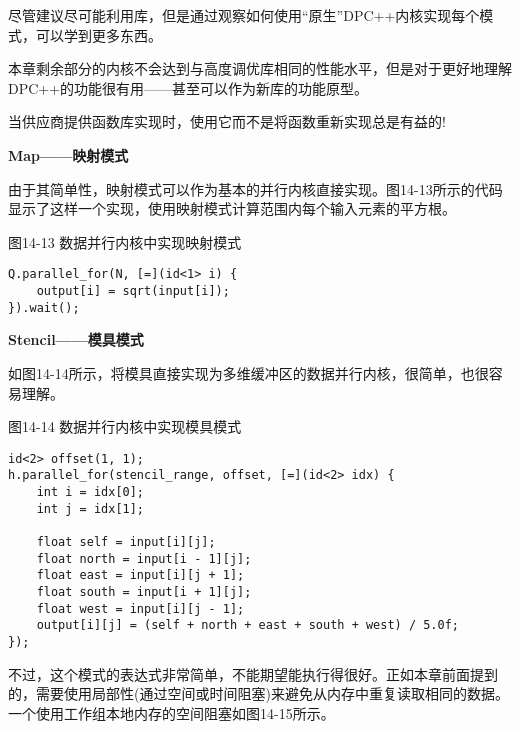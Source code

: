 尽管建议尽可能利用库，但是通过观察如何使用“原生”DPC++内核实现每个模式，可以学到更多东西。\par

本章剩余部分的内核不会达到与高度调优库相同的性能水平，但是对于更好地理解DPC++的功能很有用——甚至可以作为新库的功能原型。\par

\begin{tcolorbox}[colback=blue!5!white,colframe=blue!75!black, title=使用供应商提供的库!]
当供应商提供函数库实现时，使用它而不是将函数重新实现总是有益的!
\end{tcolorbox}

\hspace*{\fill} \par %
\textbf{Map——映射模式}

由于其简单性，映射模式可以作为基本的并行内核直接实现。图14-13所示的代码显示了这样一个实现，使用映射模式计算范围内每个输入元素的平方根。\par

\hspace*{\fill} \par %
图14-13 数据并行内核中实现映射模式
\begin{lstlisting}[caption={}]
Q.parallel_for(N, [=](id<1> i) {
	output[i] = sqrt(input[i]);
}).wait();
\end{lstlisting}

\hspace*{\fill} \par %
\textbf{Stencil——模具模式}

如图14-14所示，将模具直接实现为多维缓冲区的数据并行内核，很简单，也很容易理解。\par

\hspace*{\fill} \par %
图14-14 数据并行内核中实现模具模式
\begin{lstlisting}[caption={}]
id<2> offset(1, 1);
h.parallel_for(stencil_range, offset, [=](id<2> idx) {
	int i = idx[0];
	int j = idx[1];
	
	float self = input[i][j];
	float north = input[i - 1][j];
	float east = input[i][j + 1];
	float south = input[i + 1][j];
	float west = input[i][j - 1];
	output[i][j] = (self + north + east + south + west) / 5.0f;
});
\end{lstlisting}

不过，这个模式的表达式非常简单，不能期望能执行得很好。正如本章前面提到的，需要使用局部性(通过空间或时间阻塞)来避免从内存中重复读取相同的数据。一个使用工作组本地内存的空间阻塞如图14-15所示。\par

